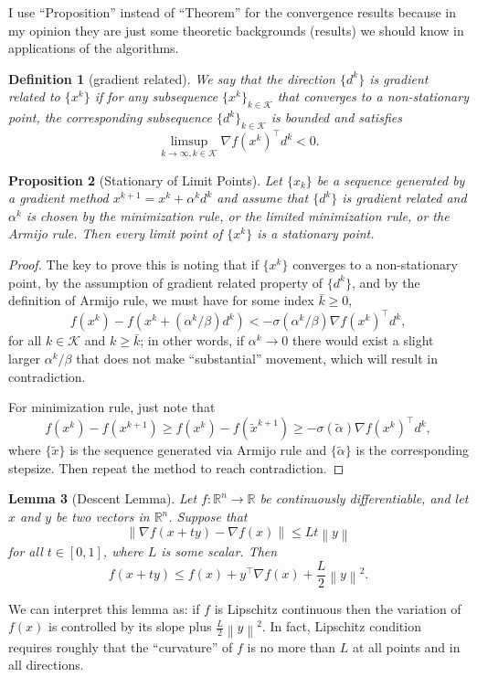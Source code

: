 \documentclass[12pt,a4paper]{article}
\numberwithin{equation}{section}
\theoremstyle{mystyle}
\newtheorem{definition}{Definition}[section]
\newtheorem{lemma}[definition]{Lemma}
\newtheorem{proposition}[definition]{Proposition}
\newcommand{\R}{\mathbb{R}}
\newcommand{\grad}{\nabla}
\newcommand{\T}{\top}
\newcommand{\norm}[1]{\left\lVert #1 \right\rVert}
\begin{document}
	I use ``Proposition'' instead of ``Theorem'' for the convergence results because in my opinion they are just some theoretic backgrounds (results) we should know in applications of the algorithms.
	
	\begin{definition}[gradient related]
		We say that the direction $\{d^k\}$ is \emph{gradient related} to $\{x^k\}$ if for any subsequence $\{x^k\}_{k\in \mathcal{K}}$ that converges to a non-stationary point, the corresponding subsequence $\{d^k\}_{k\in \mathcal{K}}$ is bounded and satisfies
		\begin{equation}
			\limsup_{k\to\infty,k\in \mathcal{K}}\grad f(x^k)^\T d^k<0.
		\end{equation}
	\end{definition}
	
	\begin{proposition}[Stationary of Limit Points]
		Let $\{x_k\}$ be a sequence generated by a gradient method $x^{k+1}=x^k + \alpha^k d^k$ and assume that $\{d^k\}$ is gradient related and $\alpha^k$ is chosen by the minimization rule, or the limited minimization rule, or the Armijo rule. Then every limit point of $\{x^k\}$ is a stationary point.
	\end{proposition}
	\begin{proof}
		The key to prove this is noting that if $\{x^k\}$ converges to a non-stationary point, by the assumption of gradient related property of $\{d^k\}$, and by the definition of Armijo rule, we must have for some index $\bar{k}\geq 0$,
		$$
		f(x^k)-f(x^k+(\alpha^k/\beta)d^k)<-\sigma(\alpha^k/\beta)\grad f(x^k)^\T d^k,
		$$
		for all $k\in \mathcal{K}$ and $k\geq \bar{k}$; in other words, if $\alpha^k\to 0$ there would exist a slight larger $\alpha^k/\beta$ that does not make ``substantial'' movement, which will result in contradiction.
	
		For minimization rule, just note that
		$$
		f(x^k)-f(x^{k+1})\geq f(x^k)-f(\tilde{x}^{k+1})\geq -\sigma(\tilde{\alpha})\grad f(x^k)^\T d^k,
		$$
		where $\{\tilde{x}\}$ is the sequence generated via Armijo rule and $\{\tilde{\alpha}\}$ is the corresponding stepsize. Then repeat the method to reach contradiction.
	\end{proof}

	\begin{lemma}[Descent Lemma]
		Let $f:\R^n \to \R$ be continuously differentiable, and let $x$ and $y$ be two vectors in $\R^n$. Suppose that
		$$
		\norm{\grad f(x+ty)-\grad f(x)}\leq L t \norm{y}
		$$
		for all $t\in [0,1]$, where $L$ is some scalar. Then
		$$
		f(x+ty)\leq f(x)+y^\T \grad f(x) +\frac{L}{2}\norm{y}^2.
		$$
	\end{lemma}
	We can interpret this lemma as: if $f$ is Lipschitz continuous then the variation of $f(x)$ is controlled by its slope plus $\frac{L}{2}\norm{y}^2$. In fact, Lipschitz condition requires roughly that the ``curvature'' of $f$ is no more than $L$ at all points and in all directions.
	
\end{document}
